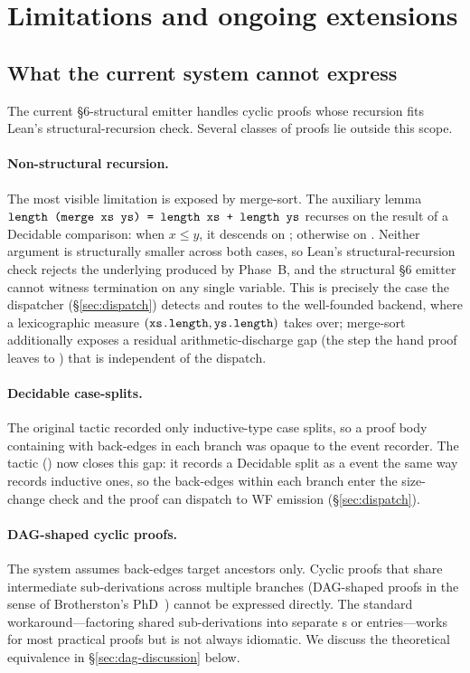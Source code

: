\section{Limitations and ongoing extensions}
\label{sec:limitations}

\subsection{What the current system cannot express}

The current §6-structural emitter handles cyclic proofs whose recursion
fits Lean's structural-recursion check. Several classes of proofs lie
outside this scope.

\paragraph{Non-structural recursion.}
The most visible limitation is exposed by merge-sort. The auxiliary lemma
\(\texttt{length (merge xs ys) = length xs + length ys}\) recurses on the
result of a Decidable comparison: when \(x \le y\), it descends on
; otherwise on . Neither argument is structurally smaller
across both cases, so Lean's structural-recursion check rejects the
underlying  produced by Phase~B, and the structural §6 emitter
cannot witness termination on any single variable. This is precisely the
case the dispatcher (§\ref{sec:dispatch}) detects and routes to the
well-founded backend, where a lexicographic measure
\((\texttt{xs.length}, \texttt{ys.length})\) takes over; merge-sort additionally
exposes a residual arithmetic-discharge gap (the  step the hand
proof leaves to ) that is independent of the dispatch.

\paragraph{Decidable case-splits.}
The original  tactic recorded only inductive-type case
splits, so a proof body containing  with back-edges
in each branch was opaque to the event recorder. The 
tactic () now closes this gap: it records a
Decidable split as a  event the same way
 records inductive ones, so the back-edges within each
branch enter the size-change check and the proof can dispatch to WF
emission (§\ref{sec:dispatch}).

\paragraph{DAG-shaped cyclic proofs.}
The system assumes back-edges target ancestors only. Cyclic proofs that
share intermediate sub-derivations across multiple branches (DAG-shaped
proofs in the sense of Brotherston's PhD~\cite{brotherston2006phd}) cannot
be expressed directly. The standard workaround---factoring shared
sub-derivations into separate s or 
entries---works for most practical proofs but is not always idiomatic. We
discuss the theoretical equivalence in §\ref{sec:dag-discussion} below.

